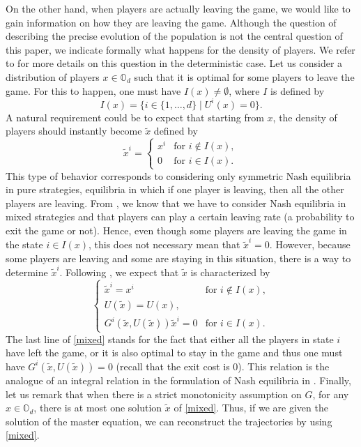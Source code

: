 \documentclass[JEP,XML,SOM,Unicode,NoEqCountersInSection,published]{cedram}
\let\sep\mid
\theoremstyle{definition}
\begin{document}
On the other hand, when players are actually leaving the game, we would like to gain information on how they are leaving the game. Although the question of describing the precise evolution of the population is not the central question of this paper, we indicate formally what happens for the density of players. We refer to \cite{bertucci2018optimal} for more details on this question in the deterministic case. Let us consider a distribution of players $x \in \mathbb{O}_d$ such that it is optimal for some players to leave the game. For this to happen, one must have $ I(x)\ne \emptyset $, where $I$ is defined by
\begin{equation}\label{defI}
I(x) = \{ i \in \{1,\dots,d\} \sep U^i(x) = 0 \}.
\end{equation}
A natural requirement could be to expect that starting from $x$, the density of players should instantly become $\tilde{x}$ defined by
\begin{equation}\label{pure}
\tilde{x}^i = \begin{cases}
x^i &\text{for } i \notin I(x),\\
0 &\text{for } i \in I(x).
\end{cases}
\end{equation}
This type of behavior corresponds to considering only symmetric Nash equilibria in pure strategies, \ie equilibria in which if one player is leaving, then all the other players are leaving. From \cite{bertucci2018optimal}, we know that we have to consider Nash equilibria in mixed strategies and that players can play a certain leaving rate (a probability to exit the game or not). Hence, even though some players are leaving the game in the state $i \in I(x)$, this does not necessary mean that $\tilde{x}^i = 0$. However, because some players are leaving and some are staying in this situation, there is a way to determine $\tilde{x}^i$. Following \cite{bertucci2018optimal}, we expect that $\tilde{x}$ is characterized by
\begin{equation}\label{mixed}
\begin{cases}
\tilde{x}^i = x^i &\text{for } i \notin I(x),\\
U(\tilde{x}) = U(x),\\
G^i (\tilde{x}, U(\tilde{x}))\tilde{x}^i = 0 &\text{for } i \in I(x).
\end{cases}
\end{equation}
The last line of \eqref{mixed} stands for the fact that either all the players in state $i$ have left the game, or it is also optimal to stay in the game and thus one must have $G^i (\tilde{x}, U(\tilde{x})) = 0$ (recall that the exit cost is $0$). This relation is the analogue of an integral relation in the formulation of Nash equilibria in \cite{bertucci2018optimal}. Finally, let us remark that when there is a strict monotonicity assumption on $G$, for any $x \in \mathbb{O}_d$, there is at most one solution $\tilde{x}$ of \eqref{mixed}. Thus, if we are given the solution of the master equation, we can reconstruct the trajectories by using \eqref{mixed}.
\end{document}
